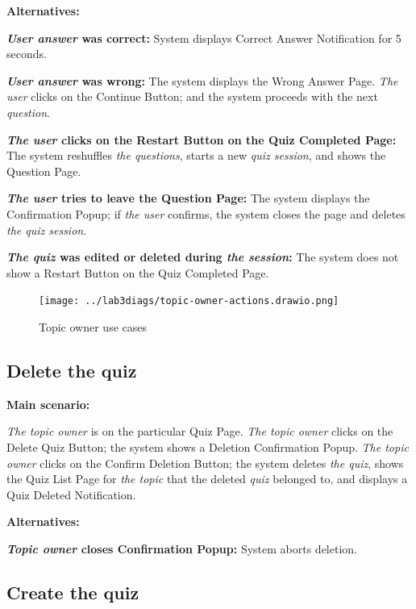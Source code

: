 \documentclass[
    english, %
]{VUMIFPSkursinis}
\begin{document}
\noindent\textbf{\fontsize{13}{15}\selectfont Alternatives:}

\textbf{\textit{User answer} was correct:} System displays Correct Answer Notification for 5 seconds.

\textbf{\textit{User answer} was wrong:} The system displays the Wrong Answer Page. \textit{The user} clicks on the Continue Button; and the system proceeds with the next \textit{question}.

\textbf{\textit{The user} clicks on the Restart Button on the Quiz Completed Page:} The system reshuffles \textit{the questions}, starts a new \textit{quiz session}, and shows the Question Page.

\textbf{\textit{The user} tries to leave the Question Page:} The system displays the Confirmation Popup; if \textit{the user} confirms, the system closes the page and deletes \textit{the quiz session}.

\textbf{\textit{The quiz} was edited or deleted during \textit{the session}:} The system does not show a Restart Button on the Quiz Completed Page.

\begin{figure}[ht]
    \centering
    \texttt{[image: ../lab3diags/topic-owner-actions.drawio.png]}
    \caption{Topic owner use cases}
    \label{topic-owner}
\end{figure}

\subsection{Delete the quiz}

\noindent\textbf{\fontsize{13}{15}\selectfont Main scenario:}

\textit{The topic owner} is on the particular Quiz Page. \textit{The topic owner} clicks on the Delete Quiz Button; the system shows a Deletion Confirmation Popup. \textit{The topic owner} clicks on the Confirm Deletion Button; the system deletes \textit{the quiz}, shows the Quiz List Page for \textit{the topic} that the deleted \textit{quiz} belonged to, and displays a Quiz Deleted Notification.

\noindent\textbf{\fontsize{13}{15}\selectfont Alternatives:}

\textbf{\textit{Topic owner} closes Confirmation Popup:} System aborts deletion.

\subsection{Create the quiz}
\end{document}

